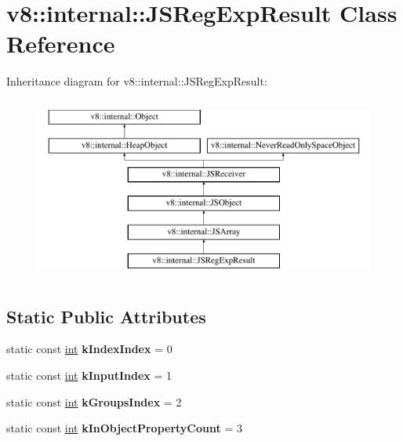 \hypertarget{classv8_1_1internal_1_1JSRegExpResult}{}\section{v8\+:\+:internal\+:\+:J\+S\+Reg\+Exp\+Result Class Reference}
\label{classv8_1_1internal_1_1JSRegExpResult}
Inheritance diagram for v8\+:\+:internal\+:\+:J\+S\+Reg\+Exp\+Result\+:\begin{figure}[H]
\begin{center}
\leavevmode
\includegraphics[height=6.000000cm]{classv8_1_1internal_1_1JSRegExpResult}
\end{center}
\end{figure}
\subsection*{Static Public Attributes}
\begin{DoxyCompactItemize}
\item 
\mbox{\label{classv8_1_1internal_1_1JSRegExpResult_a1a10ad481cbf4e7bb27b376d827155ea}} 
static const \mbox{\hyperlink{classint}{int}} {\bfseries k\+Index\+Index} = 0
\item 
\mbox{\label{classv8_1_1internal_1_1JSRegExpResult_a4f1188f12cec956861acdbfbaf20fe8b}} 
static const \mbox{\hyperlink{classint}{int}} {\bfseries k\+Input\+Index} = 1
\item 
\mbox{\label{classv8_1_1internal_1_1JSRegExpResult_aa16a8d43da63047bf5c19663d45b7f95}} 
static const \mbox{\hyperlink{classint}{int}} {\bfseries k\+Groups\+Index} = 2
\item 
\mbox{\label{classv8_1_1internal_1_1JSRegExpResult_ac06e42a7ca09ff83b9ef4425382ddd26}} 
static const \mbox{\hyperlink{classint}{int}} {\bfseries k\+In\+Object\+Property\+Count} = 3
\end{DoxyCompactItemize}
